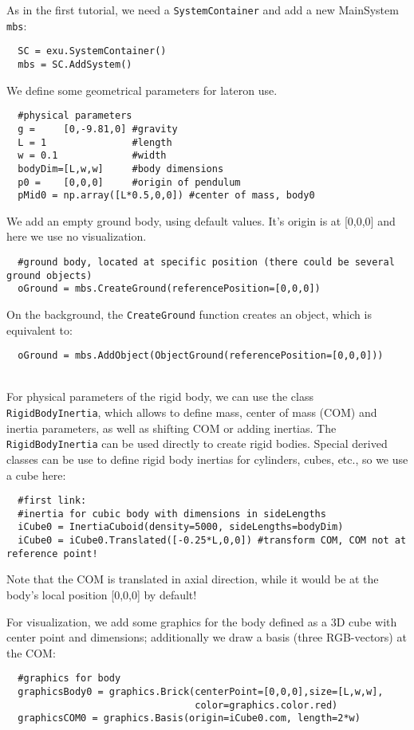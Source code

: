 \noindent As in the first tutorial, we need a \texttt{SystemContainer} and add a new MainSystem \texttt{mbs}:
\pythonstyle\begin{lstlisting}
  SC = exu.SystemContainer()
  mbs = SC.AddSystem()
\end{lstlisting}

\noindent We define some geometrical parameters for lateron use.
\pythonstyle\begin{lstlisting}
  #physical parameters
  g =     [0,-9.81,0] #gravity
  L = 1               #length
  w = 0.1             #width
  bodyDim=[L,w,w]     #body dimensions
  p0 =    [0,0,0]     #origin of pendulum
  pMid0 = np.array([L*0.5,0,0]) #center of mass, body0
\end{lstlisting}

\noindent We add an empty ground body, using default values. It's origin is at [0,0,0] and here we use no visualization.
\pythonstyle\begin{lstlisting}
  #ground body, located at specific position (there could be several ground objects)
  oGround = mbs.CreateGround(referencePosition=[0,0,0])
\end{lstlisting}
On the background, the \texttt{CreateGround} function creates an object, which is equivalent to:
\pythonstyle\begin{lstlisting}
  oGround = mbs.AddObject(ObjectGround(referencePosition=[0,0,0]))
\end{lstlisting}

\horizontalRuler\\
\noindent For physical parameters of the rigid body, we can use the class \texttt{RigidBodyInertia}, which allows to define mass, center of mass (COM) and inertia parameters, as well as shifting COM or adding inertias.
The \texttt{RigidBodyInertia} can be used directly to create rigid bodies. Special derived classes can be use to define rigid body inertias for cylinders, cubes, etc., so we use a cube here:
\pythonstyle\begin{lstlisting}
  #first link:
  #inertia for cubic body with dimensions in sideLengths
  iCube0 = InertiaCuboid(density=5000, sideLengths=bodyDim)
  iCube0 = iCube0.Translated([-0.25*L,0,0]) #transform COM, COM not at reference point!
\end{lstlisting}
Note that the COM is translated in axial direction, while it would be at the body's local position [0,0,0] by default!

\noindent For visualization, we add some graphics for the body defined as a 3D cube with center point and dimensions; additionally we draw a basis (three RGB-vectors) at the COM:
\pythonstyle\begin{lstlisting}
  #graphics for body
  graphicsBody0 = graphics.Brick(centerPoint=[0,0,0],size=[L,w,w],
                                 color=graphics.color.red)
  graphicsCOM0 = graphics.Basis(origin=iCube0.com, length=2*w)
\end{lstlisting}

